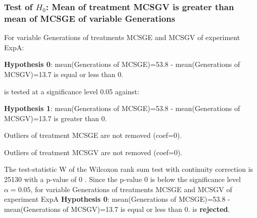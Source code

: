 \begin{frame}[t]
 \frametitle{Test of $H_{0}$: Mean of treatment MCSGV is greater than mean of MCSGE of variable Generations }
 \scriptsize
 For variable Generations of treatments MCSGE and MCSGV of experiment ExpA:

\vspace{1mm}
{\bf Hypothesis 0}: mean(Generations of MCSGE)=53.8 - mean(Generations of MCSGV)=13.7 is equal or less than 0.


 \begin{center} is tested at a significance level 0.05 against: \end{center}

{\bf Hypothesis 1}: mean(Generations of MCSGE)=53.8 - mean(Generations of MCSGV)=13.7 is greater than 0.
\vspace{1mm}
\vspace{1mm}

 Outliers of treatment MCSGE  are not removed (coef=0).

 Outliers of treatment MCSGV  are not removed (coef=0).
\vspace{1mm}
 
 The test-statistic W of the Wilcoxon rank sum test with continuity correction is 25130 with a p-value of 0 .
 Since the p-value 0 is below the significance level $\alpha= 0.05 $,
 for variable Generations of treatments MCSGE and MCSGV of experiment ExpA 
 {\bf Hypothesis 0}: mean(Generations of MCSGE)=53.8 - mean(Generations of MCSGV)=13.7 is equal or less than 0.
is {\bf rejected}.

 \end{frame}
